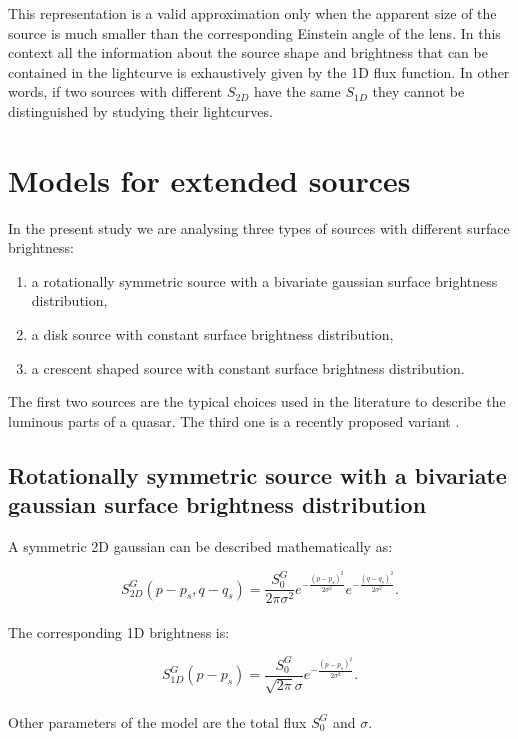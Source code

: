 \documentclass[usenatbib]{mn2e}
\begin{document}
This representation is a valid approximation only when the apparent size of the source is much smaller than the corresponding Einstein angle of the lens. In this context 
all the information about the source shape and brightness that can be contained in the lightcurve is exhaustively given by the 1D flux function.
In other words, if two sources with different $S_{2D}$ have the same $S_{1D}$ they cannot be distinguished by studying their lightcurves.
 
 
\section{Models for extended sources}\label{sec:source-models}

In the present study we are analysing three types of sources with different surface brightness: 
\begin{enumerate}
 \renewcommand{\theenumi}{(\arabic{enumi})}
  \item a rotationally symmetric source with a bivariate gaussian surface brightness distribution,
  \item a disk source with constant surface brightness distribution,
  \item a crescent shaped source with constant surface brightness distribution.
\end{enumerate}
The first two sources are the typical choices used in the literature to describe the luminous parts of a quasar. 
The third one is a recently proposed variant \citep{2013MNRAS.434..765K}.




\subsection{Rotationally symmetric source with a bivariate gaussian surface brightness distribution}\label{subsec:gaussian}

A symmetric 2D gaussian can be described mathematically as:

\begin{equation}
 S_{2D}^G(p-p_s, q-q_s) = \frac{S_0^G}{2 \pi \sigma^2} e^{-\frac{(p-p_s)^2}{2 \sigma^2}} e^{-\frac{(q-q_s)^2}{2 \sigma^2}}.
\end{equation}
\\
The corresponding 1D brightness is:

\begin{equation}
 S_{1D}^G(p-p_s) = \frac{S_0^G}{\sqrt{2 \pi} \sigma} e^{-\frac{(p-p_s)^2}{2 \sigma^2}}.
\end{equation}
\\
Other parameters of the model are the total flux $S_0^G$ and $\sigma$. 
\end{document}
